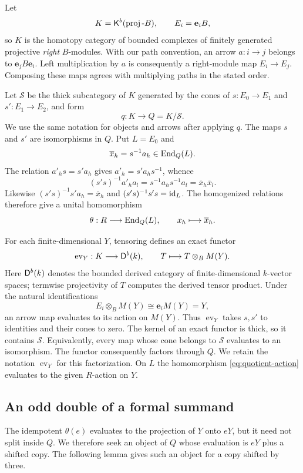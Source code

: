 Let
\[
  K=\mathsf K^b(\operatorname{proj}\text{-}B),\qquad E_i=\mathbf e_iB,
\]
so $K$ is the homotopy category of bounded complexes of finitely
generated projective \emph{right} $B$-modules.  With our path convention,
an arrow $a:i\to j$ belongs to $\mathbf e_jB\mathbf e_i$.
Left multiplication by $a$ is consequently a right-module map
$E_i\to E_j$.  Composing these maps agrees with multiplying paths
in the stated order.

Let $\mathcal S$ be the thick subcategory of $K$ generated by the
cones of $s:E_0\to E_1$ and $s':E_1\to E_2$, and form
\[
  q:K\longrightarrow Q=K/\mathcal S.
\]
We use the same notation for objects and arrows after applying $q$.
The maps $s$ and $s'$ are isomorphisms in $Q$.  Put $L=E_0$ and
\[
  \overline x_h=s^{-1}a_h\in\operatorname{End}_Q(L).
\]
The relation $a'_h s=s'a_h$ gives $a'_h=s'a_hs^{-1}$, whence
\[
  (s's)^{-1}a'_ha_l
     =s^{-1}a_hs^{-1}a_l
     =\overline x_h\overline x_l.
\]
Likewise $(s's)^{-1}s'a_h=\overline x_h$ and
$(s's)^{-1}s's=\operatorname{id}_L$.  The homogenized relations therefore give
a unital homomorphism
\begin{equation}\label{eq:quotient-action}
  \theta:R\longrightarrow\operatorname{End}_Q(L),
  \qquad x_h\longmapsto\overline x_h.
\end{equation}

For each finite-dimensional $Y$, tensoring defines an exact functor
\[
  \operatorname{ev}_Y:K\longrightarrow\mathsf D^b(k),
  \qquad T\longmapsto T\otimes_B M(Y).
\]
Here $\mathsf D^b(k)$ denotes the bounded derived category of finite-dimensional
$k$-vector spaces; termwise projectivity of $T$ computes the derived
tensor product.  Under the natural identifications
\[
  E_i\otimes_B M(Y)\cong\mathbf e_iM(Y)=Y,
\]
an arrow map evaluates to its action on $M(Y)$.  Thus
$\operatorname{ev}_Y$ takes $s,s'$ to identities and their cones to zero.
The kernel of an exact functor is thick, so it contains $\mathcal S$.
Equivalently, every map whose cone belongs to $\mathcal S$ evaluates
to an isomorphism.  The functor consequently factors through $Q$.
We retain the notation $\operatorname{ev}_Y$ for this factorization.
On $L$ the homomorphism \eqref{eq:quotient-action} evaluates to the
given $R$-action on $Y$.

\subsection{An odd double of a formal summand}

The idempotent $\theta(e)$ evaluates to the projection of $Y$ onto
$eY$, but it need not split inside $Q$. We therefore seek an object
of $Q$ whose evaluation is $eY$ plus a shifted copy. The following
lemma gives such an object for a copy shifted by three.


